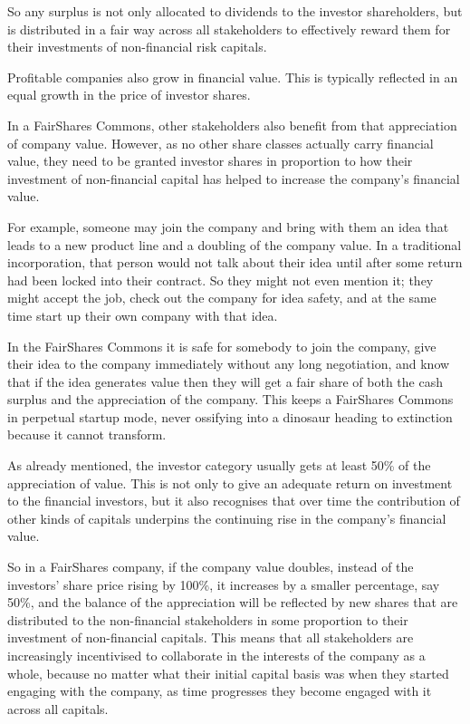 So any surplus is not only allocated to dividends to the investor shareholders, but is distributed in a fair way across all stakeholders to effectively reward them for their investments of non-financial risk capitals.


Profitable companies also grow in financial value. This is typically reflected in an equal growth in the price of investor shares.


In a FairShares Commons, other stakeholders also benefit from that appreciation of company value. However, as no other share classes actually carry financial value, they need to be granted investor shares in proportion to how their investment of non-financial capital has helped to increase the company’s financial value.


For example, someone may join the company and bring with them an idea that leads to a new product line and a doubling of the company value. In a traditional incorporation, that person would not talk about their idea until after some return had been locked into their contract. So they might not even mention it; they might accept the job, check out the company for idea safety, and at the same time start up their own company with that idea.


In the FairShares Commons it is safe for somebody to join the company, give their idea to the company immediately without any long negotiation, and know that if the idea generates value then they will get a fair share of both the cash surplus and the appreciation of the company. This keeps a FairShares Commons in perpetual startup mode, never ossifying into a dinosaur heading to extinction because it cannot transform.


As already mentioned, the investor category usually gets at least 50\% of the appreciation of value. This is not only to give an adequate return on investment to the financial investors, but it also recognises that over time the contribution of other kinds of capitals underpins the continuing rise in the company’s financial value.


So in a FairShares company, if the company value doubles, instead of the investors' share price rising by 100\%, it increases by a smaller percentage, say 50\%, and the balance of the appreciation will be reflected by new shares that are distributed to the non-financial stakeholders in some proportion to their investment of non-financial capitals.
This means that all stakeholders are increasingly incentivised to collaborate in the interests of the company as a whole, because no matter what their initial capital basis was when they started engaging with the company, as time progresses they become engaged with it across all capitals.


